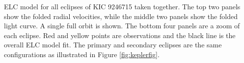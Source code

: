 \label{fig:ELCresult} ELC model for all eclipses of KIC 9246715 taken together. The top two panels show the folded radial velocities, while the middle two panels show the folded light curve. A single full orbit is shown. The bottom four panels are a zoom of each eclipse. Red and yellow points are observations and the black line is the overall ELC model fit. The primary and secondary eclipses are the same configurations as illustrated in Figure \ref{fig:keplerfig}.